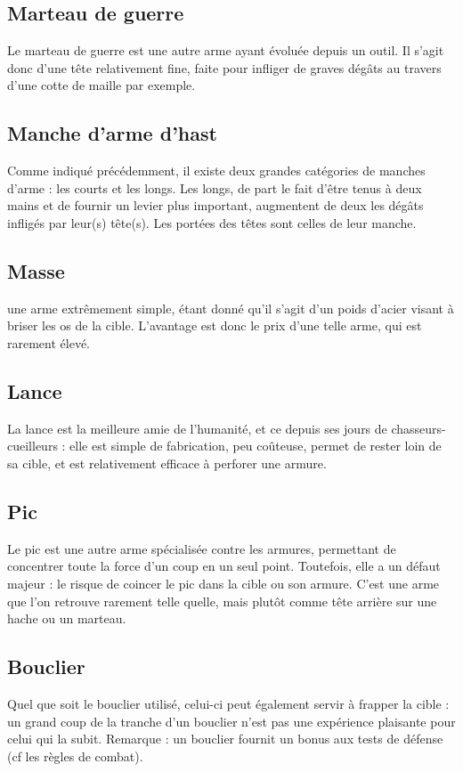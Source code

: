\documentclass[10pt,a4paper,twocolumn]{book}
\begin{document}
\subsection*{Marteau de guerre}
Le marteau de guerre est une autre arme ayant évoluée depuis un outil. Il s’agit donc d’une tête relativement fine, faite pour infliger de graves dégâts au travers d’une cotte de maille par exemple.
\subsection*{Manche d’arme d’hast}
Comme indiqué précédemment, il existe deux grandes catégories de manches d’arme : les courts et les longs. Les longs, de part le fait d’être tenus à deux mains et de fournir un levier plus important, augmentent de deux les dégâts infligés par leur(s) tête(s). Les portées des têtes sont celles de leur manche.
\subsection*{Masse}
une arme extrêmement simple, étant donné qu’il s’agit d’un poids d’acier visant à briser les os de la cible. L’avantage est donc le prix d’une telle arme, qui est rarement élevé.
\subsection*{Lance}
La lance est la meilleure amie de l’humanité, et ce depuis ses jours de chasseurs-cueilleurs : elle est simple de fabrication, peu coûteuse, permet de rester loin de sa cible, et est relativement efficace à perforer une armure.
\subsection*{Pic}
Le pic est une autre arme spécialisée contre les armures, permettant de concentrer toute la force d’un coup en un seul point. Toutefois, elle a un défaut majeur : le risque de coincer le pic dans la cible ou son armure. C’est une arme que l’on retrouve rarement telle quelle, mais plutôt comme tête arrière sur une hache ou un marteau.
\subsection*{Bouclier}
Quel que soit le bouclier utilisé, celui-ci peut également servir à frapper la cible : un grand coup de la tranche d’un bouclier n’est pas une expérience plaisante pour celui qui la subit. Remarque : un bouclier fournit un bonus aux tests de défense (cf les règles de combat).
\end{document}
